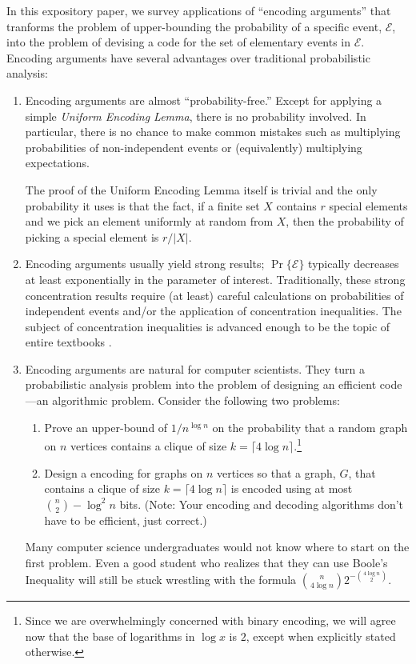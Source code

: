 \documentclass{patmorin}
\begin{document}
In this expository paper, we survey applications of ``encoding
arguments'' that tranforms the problem of upper-bounding the
probability of a specific event, $\mathcal{E}$, into the problem of
devising a code for the set of elementary events in $\mathcal{E}$.
Encoding arguments have several advantages over traditional
probabilistic analysis:

\begin{enumerate}
\item Encoding arguments are almost ``probability-free.''  Except for
  applying a simple \emph{Uniform Encoding Lemma}, there is no
  probability involved.  In particular, there is no chance to make
  common mistakes such as multiplying probabilities of non-independent
  events or (equivalently) multiplying expectations.

  The proof of the Uniform Encoding Lemma itself is trivial and the
  only probability it uses is that the fact, if a finite set $X$
  contains $r$ special elements and we pick an element uniformly at
  random from $X$, then the probability of picking a special element
  is $r/|X|$.

\item Encoding arguments usually yield strong results;
  $\Pr\{\mathcal{E}\}$ typically decreases at least exponentially in
  the parameter of interest. Traditionally, these strong concentration
  results require (at least) careful calculations on probabilities of
  independent events and/or the application of concentration
  inequalities.  The subject of concentration inequalities is advanced
  enough to be the topic of entire textbooks
  \cite{boucheron.lugosi.ea:concentration,dubhashi.panconesi:concentration}.
  
\item Encoding arguments are natural for computer scientists. They
  turn a probabilistic analysis problem into the problem of designing
  an efficient code---an algorithmic problem. Consider the following
  two problems:
  \begin{enumerate}

  \item Prove an upper-bound of $1/n^{\log n}$ on the probability that
    a random graph on $n$ vertices contains a clique of size $k=\lceil
    4\log n\rceil$.\footnote{Since we are overwhelmingly concerned with
    binary encoding, we will
    agree now that the base of logarithms in $\log x$ is $2$, except when
    explicitly stated otherwise.}

  \item Design a encoding for graphs on $n$ vertices so that a graph,
    $G$, that contains a clique of size $k=\lceil 4\log n\rceil$ is
    encoded using at most $\binom{n}{2}-\log^2 n$ bits. (Note: Your
    encoding and decoding algorithms don't have to be efficient, just
    correct.)
  \end{enumerate}
  Many computer science undergraduates would not know where to start
  on the first problem.  Even a good student who realizes that they
  can use Boole's Inequality will still be stuck wrestling with the
  formula $\binom{n}{4\log n}2^{-\binom{4\log n}{2}}$.
\end{enumerate}
\end{document}
